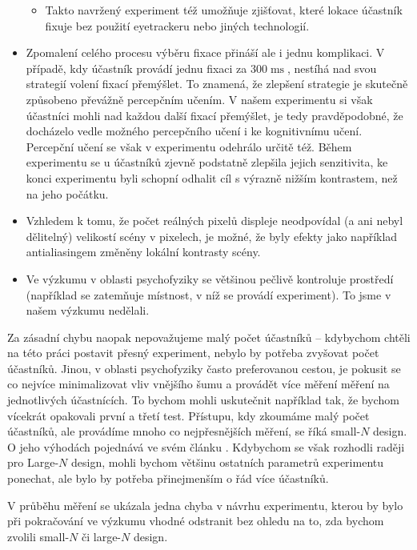 \begin{itemize}
\begin{itemize}
\item Takto navržený experiment též umožňuje zjišťovat, které lokace účastník
fixuje bez použití eyetrackeru nebo jiných technologií.

\end{itemize}

\item Zpomalení celého procesu výběru fixace přináší ale i jednu komplikaci. V případě, kdy
účastník provádí jednu fixaci za $300\operatorname{ms}$, nestíhá nad svou
strategií volení fixací přemýšlet. To znamená, že zlepšení strategie je
skutečně způsobeno převážně percepčním učením. V našem experimentu si však
účastníci mohli nad každou další fixací přemýšlet, je tedy pravděpodobné, že
docházelo vedle možného percepčního učení  i ke kognitivnímu učení. Percepční
učení se však v experimentu odehrálo určitě též.  Během experimentu se u
účastníků zjevně podstatně zlepšila jejich senzitivita, ke konci experimentu
byli schopní odhalit cíl s výrazně nižším kontrastem, než na jeho počátku.


\item Vzhledem k tomu, že počet reálných pixelů displeje neodpovídal (a ani
nebyl dělitelný) velikostí scény v pixelech, je možné, že byly efekty jako
například antialiasingem změněny lokální kontrasty scény.

\item Ve výzkumu v oblasti psychofyziky se většinou
pečlivě kontroluje prostředí (například se zatemňuje místnost, v níž se provádí experiment). To jsme v našem výzkumu nedělali.

\end{itemize}

Za zásadní chybu naopak
nepovažujeme malý počet účastníků -- kdybychom chtěli na této práci postavit
přesný experiment, nebylo by potřeba zvyšovat počet účastníků. Jinou, v oblasti
psychofyziky často preferovanou cestou, je pokusit se co nejvíce minimalizovat vliv vnějšího šumu a provádět více měření
měření na jednotlivých účastnících. To bychom mohli uskutečnit například tak, že bychom vícekrát opakovali
první a třetí test. Přístupu, kdy zkoumáme malý počet účastníků, ale provádíme mnoho co nejpřesnějších měření, se říká small-$N$ design. O jeho výhodách pojednává ve svém článku \citet{SmallN}. Kdybychom se však rozhodli raději pro Large-$N$ design, mohli
bychom většinu ostatních parametrů experimentu ponechat, ale bylo by potřeba
přinejmenším o řád více účastníků.

V průběhu měření se ukázala jedna chyba v návrhu experimentu, kterou by
bylo při pokračování ve výzkumu vhodné odstranit bez ohledu na to, zda bychom
zvolili small-$N$ či large-$N$ design. 

